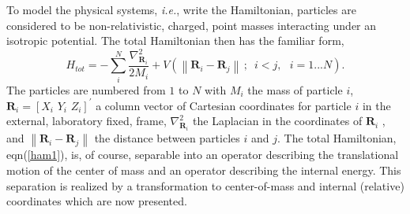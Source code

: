 \documentclass[12pt,thmsa]{article}
\begin{document}
To model the physical systems, \textit{i.e.}, write the Hamiltonian,
particles are considered to be non-relativistic, charged, point masses
interacting under an isotropic potential. The total Hamiltonian then has the
familiar form, 
\begin{equation}
H_{tot}=-\sum_i^N\frac{\nabla _{\mathbf{R}_i}^2}{2M_i}+V\left( \left\| 
\mathbf{R}_i-\mathbf{R}_j\right\| \,;\,\,\,i<j,\,\,\,\,i=1...N\right) .
\label{ham1}
\end{equation}
The particles are numbered from $1$ to $N$ with $M_i$ the mass of particle $i
$, $\mathbf{R}_i=[X_i\,\,Y_i\,\,Z_i]^{\prime }$ a column vector of Cartesian
coordinates for particle $i$ in the external, laboratory fixed, frame, $%
\nabla _{\mathbf{R}_i}^2$ the Laplacian in the coordinates of $\mathbf{R}_i$%
, and $\left\| \mathbf{R}_i-\mathbf{R}_j\right\| $ the distance between
particles $i$ and $j$. The total Hamiltonian, eqn(\ref{ham1}), is, of
course, separable into an operator describing the translational motion of
the center of mass and an operator describing the internal energy. This
separation is realized by a transformation to center-of-mass and internal
(relative) coordinates which are now presented.
\end{document}

